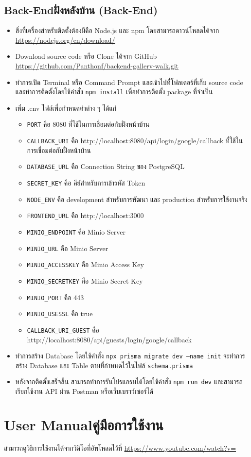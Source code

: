 \section{\ifenglish Back-End\else ฝั่งหลังบ้าน (Back-End)\fi}
\begin{itemize}
    \item สิ่งที่เครื่องสำหรับติดตั้งต้องมีคือ Node.js และ npm โดยสามารถดาวน์โหลดได้จาก \url{https://nodejs.org/en/download/}
    \item Download source code หรือ Clone ได้จาก GitHub \url{https://github.com/Panthonf/backend-gallery-walk.git}
    \item ทำการเปิด Terminal หรือ Command Prompt และเข้าไปที่โฟลเดอร์ที่เก็บ source code และทำการติดตั้งโดยใช้คำสั่ง \texttt{npm install} เพื่อทำการติดตั้ง package ที่จำเป็น
    \item เพิ่ม .env ไฟล์เพื่อกำหนดค่าต่าง ๆ ได้แก่
          \begin{itemize}
              \item \texttt{PORT} คือ 8080 ที่ใช้ในการเชื่อมต่อกับฝั่งหน้าบ้าน
              \item \texttt{CALLBACK\_URI} คือ http://localhost:8080/api/login/google/callback ที่ใช้ในการเชื่อมต่อกับฝั่งหน้าบ้าน
              \item \texttt{DATABASE\_URL} คือ Connection String ของ PostgreSQL
              \item \texttt{SECRET\_KEY} คือ คีย์สำหรับการเข้ารหัส Token
              \item \texttt{NODE\_ENV} คือ development สำหรับการพัฒนา และ production สำหรับการใช้งานจริง
              \item \texttt{FRONTEND\_URL} คือ http://localhost:3000
              \item \texttt{MINIO\_ENDPOINT} คือ Minio Server
              \item \texttt{MINIO\_URL} คือ Minio Server
              \item \texttt{MINIO\_ACCESSKEY} คือ Minio Access Key
              \item \texttt{MINIO\_SECRETKEY} คือ Minio Secret Key
              \item \texttt{MINIO\_PORT} คือ 443
              \item \texttt{MINIO\_USESSL} คือ true
              \item \texttt{CALLBACK\_URI\_GUEST} คือ http://localhost:8080/api/guests/login/google/callback
          \end{itemize}
    \item ทำการสร้าง Database โดยใช้คำสั่ง \texttt{npx prisma migrate dev --name init} จะทำการสร้าง Database และ Table ตามที่กำหนดไว้ในไฟล์ \texttt{schema.prisma}
    \item หลังจากติดตั้งเสร็จสิ้น สามารถทำการรันโปรแกรมได้โดยใช้คำสั่ง \texttt{npm run dev} และสามารถเรียกใช้งาน API ผ่าน Postman หรือเว็บเบราว์เซอร์ได้
\end{itemize}


\chapter{\ifenglish User Manual\else คู่มือการใช้งาน\fi}
สามารถดูวิธีการใช้งานได้จากวิดีโอที่อัพโหลดไว้ที่ \url{https://www.youtube.com/watch?v=} 

